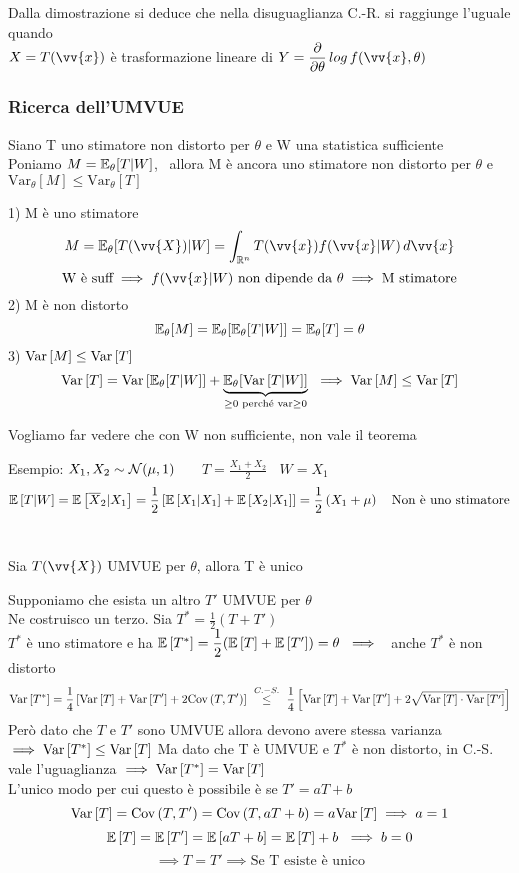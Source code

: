 Dalla dimostrazione si deduce che nella disuguaglianza C.-R. si raggiunge l'uguale quando \\ $X=T(\vv{x})$ è trasformazione lineare di $Y=\frac{\partial}{\partial\theta}\,log\,f(\vv{x},\theta)$




\subsubsection*{Ricerca dell'UMVUE}

\begin{teo}
Siano T uno stimatore non distorto per $\theta$ e W una statistica sufficiente \\
Poniamo $M=\mathbb E_{\theta}[T|W]$, \ allora M è ancora uno stimatore non distorto per $\theta$ e \ $\text{Var}_{\theta}[M]\le \text{Var}_{\theta}[T]$
\end{teo}

\begin{Dim}
1) M è uno stimatore
\[
M=\EE_{\theta}[T(\vv{X})|W]=\int_{\R^n} T(\vv{x})f(\vv{x}|W)\,d\vv{x} \] \[ \text{W è suff} \implies f(\vv{x}|W) \text{ non dipende da } \theta \implies \text{M stimatore}
\]
2) M è non distorto
\[
\mathbb E_{\theta}[M]=\mathbb E_{\theta}[\mathbb E_{\theta}[T|W]]=\mathbb E_{\theta}[T]=\theta
\]
3) $\text{Var} \left[ M \right]\le\text{Var} \left[ T \right]$
\[
\text{Var} \left[ T \right]=\text{Var} \left[ \mathbb E_{\theta}[T|W] \right] + \underset{\ge0 \text{ perché var}\ge0}{\underbrace{\mathbb E_{\theta}[\text{Var} \left[ T|W \right]]}} \ \implies \text{Var} \left[ M \right]\le\text{Var} \left[ T \right]
\]
\end{Dim}

Vogliamo far vedere che con W non sufficiente, non vale il teorema

Esempio: $X_1,X_2\sim\mathcal N(\mu,1)$ \ \ \ $T=\frac{X_1+X_2}{2} \ \ \ \ W=X_1$
\[\mathbb{E} \left[ T|W \right]=
\mathbb{E} \left[ \overline{X}_2|X_1 \right]=\dfrac12\left[\mathbb{E} \left[ X_1|X_1 \right]+\mathbb{E} \left[ X_2|X_1 \right]\right]= \dfrac12\left( X_1+\mu\right) \ \  \text{ Non è uno stimatore}
\]\\
%
\begin{teo}
    Sia $T(\vv{X})$ UMVUE per $\theta$, allora T è unico
\end{teo}

\begin{Dim}
    Supponiamo che esista un altro $T'$ UMVUE per $\theta$\\
    Ne costruisco un terzo. Sia $T^*=\frac12(T+T')$\\
    $T^*$ è uno stimatore e ha $\E{T^*}=\frac12(\E{T}+\E{T'})=\theta \ \implies$ \ anche $T^*$ è non distorto\\
    \[
    \var{T^*}=\frac14 \OO\var{T}+\var{T'}+2\cov{T}{T'}\CC \ \overset{C.-S.}{\le} \ \frac14\OO\var{T}+\var{T'}+2\sqrt{\var{T}\cdot\var{T'}}\CC
    \]
    Però dato che $T$ e $T'$ sono UMVUE allora devono avere stessa varianza
    $\implies \text{Var} \left[ T^* \right]\le \text{Var} \left[ T \right]$ Ma dato che T è UMVUE e $T^*$ è non distorto, in C.-S. vale l'uguaglianza $ \implies \text{Var} \left[ T^* \right]=\text{Var} \left[ T \right]$\\
    L'unico modo per cui questo è possibile è se $T'=aT+b$\\
    \[\text{Var} \left[ T \right]=\text{Cov} \left( T,T' \right)=\text{Cov} \left( T,aT+b \right)=a\text{Var} \left[ T \right] \implies a=1\]
    \[\mathbb{E} \left[ T \right]=\mathbb{E} \left[ T' \right]=\mathbb{E} \left[ aT+b \right]=\mathbb{E} \left[ T \right]+b \ \implies b=0\]
    \[\implies T=T' \implies \text{Se T esiste è unico}\]
\end{Dim}

